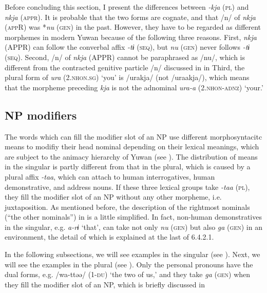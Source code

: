   Before concluding this section, I present the differences between \textit{-kja} (\textsc{pl}) and \textit{nkja} (\textsc{appr}). It is probable that the two forms are cognate, and that /n/ of \textit{nkja} (\textsc{app}R) was *\textit{nu} (\textsc{gen}) in the past. However, they have to be regarded as different morphemes in modern Yuwan because of the following three reasons. First, \textit{nkja} (APPR) can follow the converbal affix \textit{-tɨ} (\textsc{seq}), but \textit{nu} (\textsc{gen}) never follows \textit{-tɨ} (\textsc{seq}). Second, /n/ of \textit{nkja} (APPR) cannot be paraphrased as /nu/, which is different from the contracted genitive particle /n/ discussed in  in  Third, the plural form of \textit{ura} (2.\textsc{nhon}.\textsc{sg}) ‘you’ is /urakja/ (not /uraakja/), which means that the morpheme preceding \textit{kja} is not the adnominal \textit{ura-a} (2.\textsc{nhon}-\textsc{adnz}) ‘your.’

\subsection{NP modifiers}

The words which can fill the modifier slot of an NP use different morphosyntacitc means to modifiy their head nominal depending on their lexical meanings, which are subject to the animacy hierarchy of Yuwan (see ). The distribution of means in the singular is partly different from that in the plural, which is caused by a plural affix \textit{-taa}, which can attach to human interrogatives, human demonstrative, and address nouns. If these three lexical groups take \textit{-taa} (\textsc{pl}), they fill the modifier slot of an NP without any other morpheme, i.e. juxtaposition. As mentioned before, the description of the rightmost nominals (“the other nominals”) in  is a little simplified. In fact, non-human demonstratives in the singular, e.g. \textit{a-rɨ} ‘that’, can take not only \textit{nu} (\textsc{gen}) but also \textit{ga} (\textsc{gen}) in an environment, the detail of which is explained at the last of 6.4.2.1.

In the following subsections, we will see examples in the singular (see ). Next, we will see the examples in the plural (see ). Only the personal pronouns have the dual forms, e.g. /wa-ttəə/ (1-\textsc{du}) ‘the two of us,’ and they take \textit{ga} (\textsc{gen}) when they fill the modifier slot of an NP, which is briefly discussed in 


